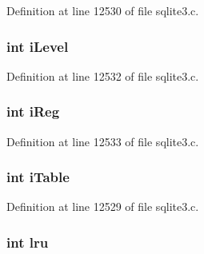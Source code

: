 Definition at line 12530 of file sqlite3.\+c.

\hypertarget{struct_parse_1_1y_col_cache_ad73f24067e0eae67be577280724e2eef}{}
\subsubsection[{i\+Level}]{\setlength{\rightskip}{0pt plus 5cm}int i\+Level}\label{struct_parse_1_1y_col_cache_ad73f24067e0eae67be577280724e2eef}


Definition at line 12532 of file sqlite3.\+c.

\hypertarget{struct_parse_1_1y_col_cache_a1be5902fe2740ac85b927b5a149ff4f9}{}
\subsubsection[{i\+Reg}]{\setlength{\rightskip}{0pt plus 5cm}int i\+Reg}\label{struct_parse_1_1y_col_cache_a1be5902fe2740ac85b927b5a149ff4f9}


Definition at line 12533 of file sqlite3.\+c.

\hypertarget{struct_parse_1_1y_col_cache_a3d7171e8cbf2d9cc6743da9da42c8828}{}
\subsubsection[{i\+Table}]{\setlength{\rightskip}{0pt plus 5cm}int i\+Table}\label{struct_parse_1_1y_col_cache_a3d7171e8cbf2d9cc6743da9da42c8828}


Definition at line 12529 of file sqlite3.\+c.

\hypertarget{struct_parse_1_1y_col_cache_aaa512d67246ca02e20b70b653950cb71}{}
\subsubsection[{lru}]{\setlength{\rightskip}{0pt plus 5cm}int lru}\label{struct_parse_1_1y_col_cache_aaa512d67246ca02e20b70b653950cb71}


